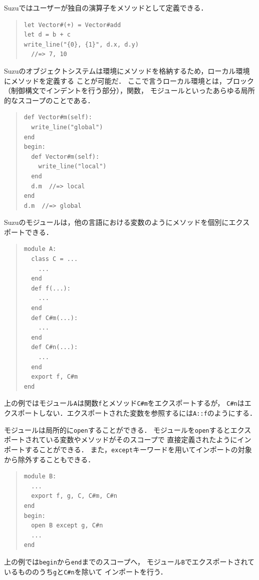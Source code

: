\documentclass{ipsjprosym}
\begin{document}
Suzuではユーザーが独自の演算子をメソッドとして定義できる．
\begin{quote}
\begin{verbatim}
let Vector#(+) = Vector#add
let d = b + c
write_line("{0}, {1}", d.x, d.y)
  //=> 7, 10
\end{verbatim}
\end{quote}

Suzuのオブジェクトシステムは環境にメソッドを格納するため，ローカル環境にメソッドを定義する
ことが可能だ．
ここで言うローカル環境とは，ブロック（制御構文でインデントを行う部分），関数，
モジュールといったあらゆる局所的なスコープのことである．
\begin{quote}
\begin{verbatim}
def Vector#m(self):
  write_line("global")
end
begin:
  def Vector#m(self):
    write_line("local")
  end
  d.m  //=> local
end
d.m  //=> global
\end{verbatim}
\end{quote}

Suzuのモジュールは，他の言語における変数のようにメソッドを個別にエクスポートできる．
\begin{quote}
\begin{verbatim}
module A:
  class C = ...
    ...
  end
  def f(...):
    ...
  end
  def C#m(...):
    ...
  end
  def C#n(...):
    ...
  end
  export f, C#m
end
\end{verbatim}
\end{quote}
上の例ではモジュール\verb|A|は関数\verb|f|とメソッド\verb|C#m|をエクスポートするが，
\verb|C#n|はエクスポートしない．エクスポートされた変数を参照するには\verb|A::f|のようにする．

モジュールは局所的に\verb|open|することができる．
モジュールを\verb|open|するとエクスポートされている変数やメソッドがそのスコープで
直接定義されたようにインポートすることができる．
また，\verb|except|キーワードを用いてインポートの対象から除外することもできる．
\begin{quote}
\begin{verbatim}
module B:
  ...
  export f, g, C, C#m, C#n
end
begin:
  open B except g, C#n
  ...
end
\end{verbatim}
\end{quote}
上の例では\verb|begin|から\verb|end|までのスコープへ，
モジュール\verb|B|でエクスポートされているもののうち\verb|g|と\verb|C#n|を除いて
インポートを行う．
\end{document}
